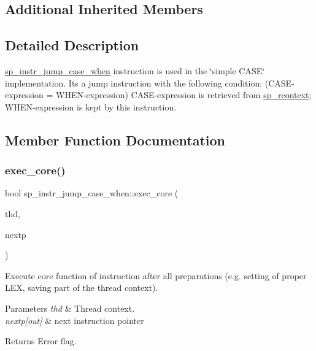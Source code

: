 \subsection*{Additional Inherited Members}


\subsection{Detailed Description}
\mbox{\hyperlink{classsp__instr__jump__case__when}{sp\+\_\+instr\+\_\+jump\+\_\+case\+\_\+when}} instruction is used in the \char`\"{}simple C\+A\+S\+E\char`\"{} implementation. It\textquotesingle{}s a jump instruction with the following condition\+: (C\+A\+SE-\/expression = W\+H\+EN-\/expression) C\+A\+SE-\/expression is retrieved from \mbox{\hyperlink{classsp__rcontext}{sp\+\_\+rcontext}}; W\+H\+EN-\/expression is kept by this instruction. 

\subsection{Member Function Documentation}
\mbox{\label{classsp__instr__jump__case__when_aaa1972f676e5c2bb3a55baf61220c5fb}} 
\subsubsection{\texorpdfstring{exec\+\_\+core()}{exec\_core()}}
{\footnotesize\ttfamily bool sp\+\_\+instr\+\_\+jump\+\_\+case\+\_\+when\+::exec\+\_\+core (\begin{DoxyParamCaption}\item[{T\+HD $\ast$}]{thd,  }\item[{uint $\ast$}]{nextp }\end{DoxyParamCaption})\hspace{0.3cm}{\ttfamily [virtual]}}

Execute core function of instruction after all preparations (e.\+g. setting of proper L\+EX, saving part of the thread context).


\begin{DoxyParams}{Parameters}
{\em thd} & Thread context. \\
\hline
{\em nextp\mbox{[}out\mbox{]}} & next instruction pointer\\
\hline
\end{DoxyParams}
\begin{DoxyReturn}{Returns}
Error flag. 
\end{DoxyReturn}


